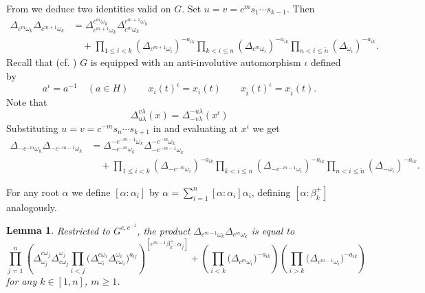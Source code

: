 \documentclass[12pt]{amsart}
\newtheorem{lemma}[theorem]{Lemma}
\numberwithin{equation}{section}
\begin{document}
From  we deduce two identities valid on $G$.
Set $u=v=c^ms_1\cdots s_{k-1}$. 
Then
\begin{align}
  \Delta_{c^m\omega_k} \Delta_{c^{m+1}\omega_k} 
  &=\Delta_{c^{m+1}\omega_k}^{c^m\omega_k} \Delta_{c^m\omega_k}^{c^{m+1}\omega_k}\\
  \nonumber &\quad+\prod_{1\leq i<k}\left(\Delta_{c^{m+1}\omega_i}\right)^{-a_{ik}}
  \prod_{k<i\leq n}\left(\Delta_{c^m\omega_i}\right)^{-a_{ik}}
  \prod_{n<i\leq\tilde{n}}\left(\Delta_{\omega_i}\right)^{-a_{ik}}
  .
\end{align}
Recall that (cf. \cite[(3.6)]{YZ}) $G$ is equipped with an anti-involutive automorphism $\iota$ defined by
\begin{equation}
  a^\iota = a^{-1} \quad (a\in H)
  \quad\quad
  x_i(t)^\iota=x_i(t)
  \quad\quad
  x_{\overline{i}}(t)^\iota=x_{\overline{i}}(t)
  .
\end{equation}
Note that 
\begin{equation}
  \Delta_{u\lambda}^{v\lambda}(x) 
  =
  \Delta_{-v\lambda}^{-u\lambda}(x^\iota)
\end{equation}
Substituting $u=v=c^{-m}s_n\cdots s_{k+1}$ in  and evaluating at $x^\iota$ we get
\begin{align}
  \Delta_{-c^{-m}\omega_k} \Delta_{-c^{-m-1}\omega_k}
  &=\Delta_{-c^{-m}\omega_k}^{-c^{-m-1}\omega_k} \Delta_{-c^{-m-1}\omega_k}^{-c^{-m}\omega_k}\\
  \nonumber &\quad+\prod_{1\leq i<k}\left(\Delta_{-c^{-m}\omega_i}\right)^{-a_{ik}}
  \prod_{k<i\leq n}\left(\Delta_{-c^{-m-1}\omega_i}\right)^{-a_{ik}}
  \prod_{n<i\leq\tilde{n}}\left(\Delta_{-\omega_i}\right)^{-a_{ik}}.
\end{align}

For any root $\alpha$ we define $[\alpha:\alpha_i]$ by $\alpha = \sum_{i=1}^n [\alpha:\alpha_i]\alpha_i$, defining $[\alpha:\beta_k^+]$ analogously.

  \begin{lemma}\label{lem:minorsondbc}
    Restricted to $G^{c,c^{-1}}$, the product $\Delta_{c^{m-1}\omega_k}\Delta_{c^{m}\omega_k}$ is equal to
    \begin{equation} 
      \prod_{j=1}^n \left( \Delta^{c \omega_j}_{\omega_j}\Delta^{\omega_j}_{ c\omega_j} \prod_{i < j}\big(\Delta^{c \omega_i}_{\omega_i} \Delta^{\omega_i}_{c \omega_i}\big)^{a_{ij}}\right)^{[c^{m-1} \beta_k^+:\alpha_j]} + 
      \left(\prod_{i < k}\big(\Delta_{c^{m}\omega_i}\big)^{-a_{ik}}\right)\left(\prod_{i>k}\big(\Delta_{c^{m-1}\omega_i}\big)^{-a_{ik}}\right)
    \end{equation}
    for any $k \in [1,n]$, $m \geq 1$.  
  \end{lemma}
\end{document}
